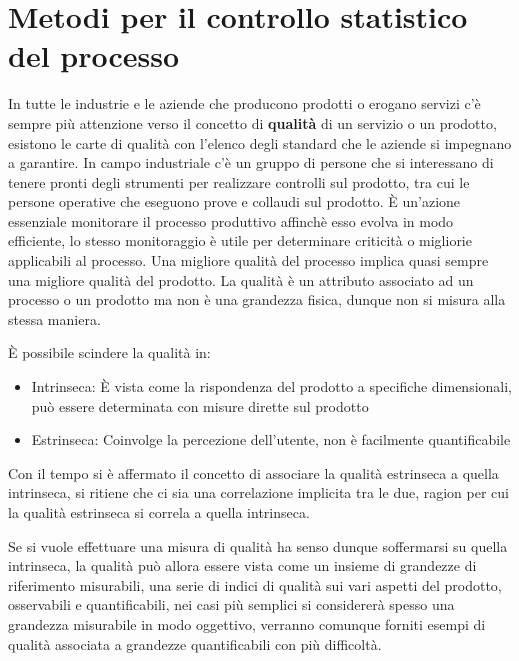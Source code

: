
\chapter{Metodi per il controllo statistico del processo}

In tutte le industrie e le aziende che producono prodotti o erogano servizi 
c'è sempre più attenzione verso il concetto di \textbf{qualità} di un servizio
o un prodotto, esistono le carte di qualità con l'elenco degli standard che le 
aziende si impegnano a garantire. In campo industriale c'è un gruppo di persone 
che si interessano di tenere pronti degli strumenti per realizzare controlli 
sul prodotto, tra cui le persone operative che eseguono prove e collaudi sul 
prodotto. È un'azione essenziale monitorare il processo produttivo affinchè 
esso evolva in modo efficiente, lo stesso monitoraggio è utile per determinare 
criticità o migliorie applicabili al processo.
Una migliore qualità del processo implica quasi sempre una migliore qualità del 
prodotto.
La qualità è un attributo associato ad un processo o un prodotto ma non è una 
grandezza fisica, dunque non si misura alla stessa maniera.

È possibile scindere la qualità in:
\begin{itemize}
    \item Intrinseca: È vista come la rispondenza del prodotto a specifiche 
    dimensionali, può essere determinata con misure dirette sul prodotto
    \item Estrinseca: Coinvolge la percezione dell'utente, non è facilmente 
    quantificabile
\end{itemize}
Con il tempo si è affermato il concetto di associare la qualità estrinseca a 
quella intrinseca, si ritiene che ci sia una correlazione implicita tra le due, 
ragion per cui la qualità estrinseca si correla a quella intrinseca.

Se si vuole effettuare una misura di qualità ha senso dunque soffermarsi su 
quella intrinseca, la qualità può allora essere vista come un insieme di 
grandezze di riferimento misurabili, una serie di indici di qualità sui vari 
aspetti del prodotto, osservabili e quantificabili, nei casi più semplici si 
considererà spesso una grandezza misurabile in modo oggettivo, verranno 
comunque forniti esempi di qualità associata a grandezze quantificabili con più 
difficoltà.

